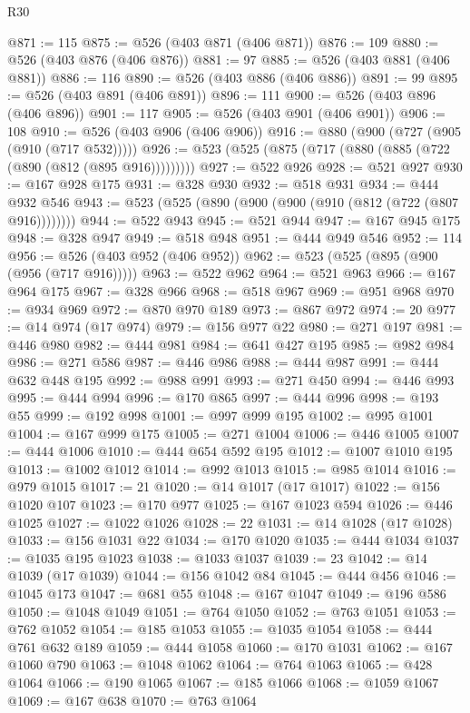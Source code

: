\begin{lexlean}{R30}
\begin{coremodule}
@871 := 115
@875 := @526 (@403 @871 (@406 @871))
@876 := 109
@880 := @526 (@403 @876 (@406 @876))
@881 := 97
@885 := @526 (@403 @881 (@406 @881))
@886 := 116
@890 := @526 (@403 @886 (@406 @886))
@891 := 99
@895 := @526 (@403 @891 (@406 @891))
@896 := 111
@900 := @526 (@403 @896 (@406 @896))
@901 := 117
@905 := @526 (@403 @901 (@406 @901))
@906 := 108
@910 := @526 (@403 @906 (@406 @906))
@916 := @880 (@900 (@727 (@905 (@910 (@717 @532)))))
@926 := @523 (@525 (@875 (@717 (@880 (@885 (@722 (@890 (@812 (@895 @916)))))))))
@927 := @522 @926
@928 := @521 @927
@930 := @167 @928 @175
@931 := @328 @930
@932 := @518 @931
@934 := @444 @932 @546
@943 := @523 (@525 (@890 (@900 (@900 (@910 (@812 (@722 (@807 @916))))))))
@944 := @522 @943
@945 := @521 @944
@947 := @167 @945 @175
@948 := @328 @947
@949 := @518 @948
@951 := @444 @949 @546
@952 := 114
@956 := @526 (@403 @952 (@406 @952))
@962 := @523 (@525 (@895 (@900 (@956 (@717 @916)))))
@963 := @522 @962
@964 := @521 @963
@966 := @167 @964 @175
@967 := @328 @966
@968 := @518 @967
@969 := @951 @968
@970 := @934 @969
@972 := @870 @970 @189
@973 := @867 @972
@974 := 20
@977 := @14 @974 (@17 @974)
@979 := @156 @977 @22
@980 := @271 @197
@981 := @446 @980
@982 := @444 @981
@984 := @641 @427 @195
@985 := @982 @984
@986 := @271 @586
@987 := @446 @986
@988 := @444 @987
@991 := @444 @632 @448 @195
@992 := @988 @991
@993 := @271 @450
@994 := @446 @993
@995 := @444 @994
@996 := @170 @865
@997 := @444 @996
@998 := @193 @55
@999 := @192 @998
@1001 := @997 @999 @195
@1002 := @995 @1001
@1004 := @167 @999 @175
@1005 := @271 @1004
@1006 := @446 @1005
@1007 := @444 @1006
@1010 := @444 @654 @592 @195
@1012 := @1007 @1010 @195
@1013 := @1002 @1012
@1014 := @992 @1013
@1015 := @985 @1014
@1016 := @979 @1015
@1017 := 21
@1020 := @14 @1017 (@17 @1017)
@1022 := @156 @1020 @107
@1023 := @170 @977
@1025 := @167 @1023 @594
@1026 := @446 @1025
@1027 := @1022 @1026
@1028 := 22
@1031 := @14 @1028 (@17 @1028)
@1033 := @156 @1031 @22
@1034 := @170 @1020
@1035 := @444 @1034
@1037 := @1035 @195 @1023
@1038 := @1033 @1037
@1039 := 23
@1042 := @14 @1039 (@17 @1039)
@1044 := @156 @1042 @84
@1045 := @444 @456
@1046 := @1045 @173
@1047 := @681 @55
@1048 := @167 @1047
@1049 := @196 @586
@1050 := @1048 @1049
@1051 := @764 @1050
@1052 := @763 @1051
@1053 := @762 @1052
@1054 := @185 @1053
@1055 := @1035 @1054
@1058 := @444 @761 @632 @189
@1059 := @444 @1058
@1060 := @170 @1031
@1062 := @167 @1060 @790
@1063 := @1048 @1062
@1064 := @764 @1063
@1065 := @428 @1064
@1066 := @190 @1065
@1067 := @185 @1066
@1068 := @1059 @1067
@1069 := @167 @638
@1070 := @763 @1064

\end{coremodule}
\end{lexlean}

